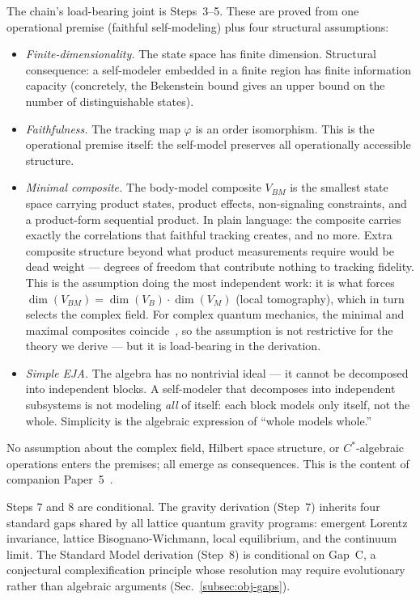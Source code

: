The chain's load-bearing joint is Steps~3--5.  These are proved from
one operational premise (faithful self-modeling) plus four structural
assumptions:
\begin{itemize}[nosep]
\item[(A1)] \emph{Finite-dimensionality.}  The state space has finite
  dimension.  Structural consequence: a self-modeler embedded in a
  finite region has finite information capacity (concretely, the
  Bekenstein bound gives an upper bound on the number of distinguishable
  states).
\item[(A2)] \emph{Faithfulness.}  The tracking map $\varphi$ is an
  order isomorphism.  This is the operational premise itself: the
  self-model preserves all operationally accessible structure.
\item[(A3)] \emph{Minimal composite.}  The body-model composite
  $V_{BM}$ is the smallest state space carrying product states,
  product effects, non-signaling constraints, and a product-form
  sequential product.  In plain language: the composite carries exactly
  the correlations that faithful tracking creates, and no more.  Extra
  composite structure beyond what product measurements require would be
  dead weight --- degrees of freedom that contribute nothing to
  tracking fidelity.  This is the assumption doing the most
  independent work: it is what forces $\dim(V_{BM}) = \dim(V_B) \cdot
  \dim(V_M)$ (local tomography), which in turn selects the complex
  field.  For complex quantum mechanics, the minimal and maximal
  composites coincide~\citep{bgw2020}, so the assumption is not
  restrictive for the theory we derive --- but it is load-bearing in
  the derivation.
\item[(A4)] \emph{Simple EJA.}  The algebra has no nontrivial
  ideal --- it cannot be decomposed into independent blocks.  A
  self-modeler that decomposes into independent subsystems is not
  modeling \emph{all} of itself: each block models only itself, not
  the whole.  Simplicity is the algebraic expression of ``whole models
  whole.''
\end{itemize}
No assumption about the complex field, Hilbert space structure, or
$C^*$-algebraic operations enters the premises; all emerge as
consequences.  This is the content of companion
Paper~5~\citep{ehrlich2026qm}.

Steps 7 and 8 are conditional.  The gravity derivation (Step~7)
inherits four standard gaps shared by all lattice quantum gravity
programs: emergent Lorentz invariance, lattice Bisognano-Wichmann,
local equilibrium, and the continuum limit.  The Standard Model
derivation (Step~8) is conditional on Gap~C, a conjectural
complexification principle whose resolution may require evolutionary
rather than algebraic arguments (Sec.~\ref{subsec:obj-gaps}).

